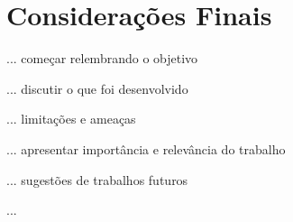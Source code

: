 
\chapter{Considerações Finais}
\label{chap:cons}

... começar relembrando o objetivo

... discutir o que foi desenvolvido

... limitações e ameaças

... apresentar importância e relevância do trabalho

... sugestões de trabalhos futuros

... 
